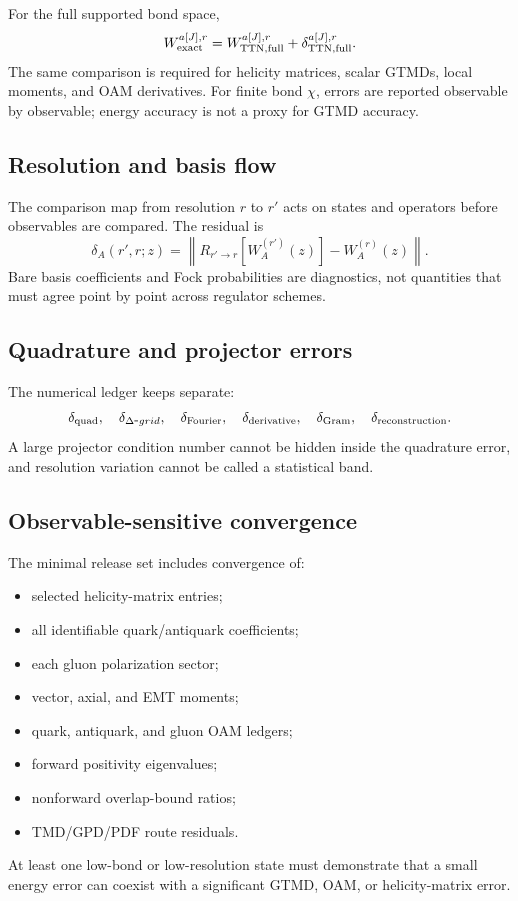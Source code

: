 \documentclass[11pt]{article}
\begin{document}
For the full supported bond space,
\begin{equation}
 W_{\rm exact}^{a[J],r}
 =W_{\rm TTN,full}^{a[J],r}
 +\delta_{\rm TTN,full}^{a[J],r}.
 \label{eq:exact-ttn-gtmd}
\end{equation}
The same comparison is required for helicity matrices, scalar GTMDs, local
moments, and OAM derivatives.  For finite bond \(\chi\), errors are reported
observable by observable; energy accuracy is not a proxy for GTMD accuracy.

\subsection{Resolution and basis flow}

The comparison map from resolution \(r\) to \(r'\) acts on states and operators
before observables are compared.  The residual is
\begin{equation}
 \delta_A(r',r;z)
 =\left\|
 R_{r'\to r}
 \left[W_A^{(r')}(z)\right]
 -W_A^{(r)}(z)
 \right\|.
 \label{eq:h4-resolution-residual}
\end{equation}
Bare basis coefficients and Fock probabilities are diagnostics, not quantities
that must agree point by point across regulator schemes.

\subsection{Quadrature and projector errors}

The numerical ledger keeps separate:
\begin{align}
 \delta_{\rm quad},\quad
 \delta_{\Delta\mbox{-}grid},\quad
 \delta_{\rm Fourier},\quad
 \delta_{\rm derivative},\quad
 \delta_{\rm Gram},\quad
 \delta_{\rm reconstruction}.
 \label{eq:h4-numerical-errors}
\end{align}
A large projector condition number cannot be hidden inside the quadrature
error, and resolution variation cannot be called a statistical band.

\subsection{Observable-sensitive convergence}

The minimal release set includes convergence of:
\begin{itemize}
\item selected helicity-matrix entries;
\item all identifiable quark/antiquark coefficients;
\item each gluon polarization sector;
\item vector, axial, and EMT moments;
\item quark, antiquark, and gluon OAM ledgers;
\item forward positivity eigenvalues;
\item nonforward overlap-bound ratios;
\item TMD/GPD/PDF route residuals.
\end{itemize}
At least one low-bond or low-resolution state must demonstrate that a small
energy error can coexist with a significant GTMD, OAM, or helicity-matrix
error.
\end{document}
